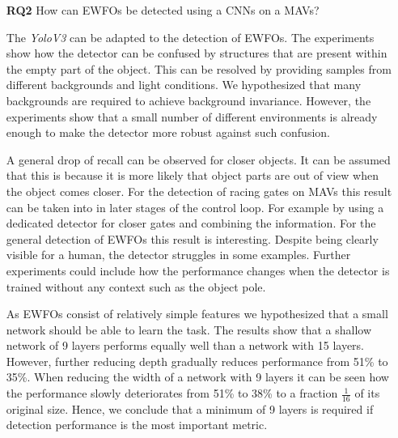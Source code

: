 \begin{enumerate}
	In summary, we propose to fully synthesize environments when creating training data for the detection of \acp{EWFO} on \acp{MAV}. Furthermore, the precision can be improved by training the detector based on view angles it will see in the real world. Possibly, by simulating the flight behaviour. In order to transfer the detector to the real world image augmentation can be used. Particularly augmenting the images by modelling lens distortion improved the performance on the investigated dataset.

	\item[\textbf{RQ2}]How can \acp{EWFO} be detected using a \acp{CNN} on a \acp{MAV}?
	
	The \textit{YoloV3} can be adapted to the detection of \acp{EWFO}. The experiments show how the detector can be confused by structures that are present within the empty part of the object. This can be resolved by providing samples from different backgrounds and light conditions. We hypothesized that many backgrounds are required to achieve background invariance. However, the experiments show that a small number of different environments is already enough to make the detector more robust against such confusion.
		
	A general drop of recall can be observed for closer objects. It can be assumed that this is because it is more likely that object parts are out of view when the object comes closer. For the detection of racing gates on \acp{MAV} this result can be taken into in later stages of the control loop. For example by using a dedicated detector for closer gates and combining the information. For the general detection of \acp{EWFO} this result is interesting. Despite being clearly visible for a human, the detector struggles in some examples. Further experiments could include how the performance changes when the detector is trained without any context such as the object pole.
	
	As \acp{EWFO} consist of relatively simple features we hypothesized that a small network should be able to learn the task. The results show that a shallow network of 9 layers performs equally well than a network with 15 layers. However, further reducing depth gradually reduces performance from 51\% to 35\%. When reducing the width of a network with 9 layers it can be seen how the performance slowly deteriorates from 51\% to 38\% to a fraction $\frac{1}{16}$ of its original size. 
	Hence, we conclude that a minimum of 9 layers is required if detection performance is the most important metric.
	

\end{enumerate}
